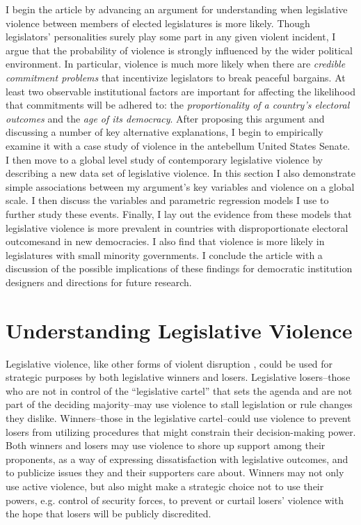 \documentclass[a4paper]{article}\usepackage[]{graphicx}\usepackage[]{color}
\begin{document}
I begin the article by advancing an argument for understanding when legislative violence between members of  elected legislatures is more likely. Though legislators' personalities surely play some part in any given violent incident, I argue that the probability of violence is strongly influenced by the wider political environment. In particular, violence is much more likely when there are \emph{credible commitment problems} that incentivize legislators to break peaceful bargains. At least two observable institutional factors are important for affecting the likelihood that commitments will be adhered to: the \emph{proportionality of a country's electoral outcomes} and the \emph{age of its democracy}. After proposing this argument and discussing a number of key alternative explanations, I begin to empirically examine it with a case study of violence in the antebellum United States Senate. I then move to a global level study of contemporary legislative violence by describing a new data set of legislative violence. In this section I also demonstrate simple associations between my argument's key variables and violence on a global scale. I then discuss the variables and parametric regression models I use to further study these events. Finally, I lay out the evidence from these models that legislative violence is more prevalent in countries with disproportionate electoral outcomesand in new democracies. I also find that violence is more likely in legislatures with small minority governments. I conclude the article with a discussion of the possible implications of these findings for democratic institution designers and directions for future research.


\section{Understanding Legislative Violence}

Legislative violence, like other forms of violent disruption \citep[]{Beaulieu2008,BeaulieuForthcoming,wilkinson2006}, could be used for strategic purposes by both legislative winners and losers. Legislative losers--those who are not in control of the ``legislative cartel''  that sets the agenda \citep{cox2007} and are not part of the deciding majority--may use violence to stall legislation or rule changes they dislike. Winners--those in the legislative cartel--could use violence to prevent losers from utilizing procedures that might constrain their decision-making power. Both winners and losers may use violence to shore up support among their proponents, as a way of expressing dissatisfaction with legislative outcomes, and to publicize issues they and their supporters care about. Winners may not only use active violence, but also might make a strategic choice not to use their powers, e.g. control of security forces, to prevent or curtail losers' violence with the hope that losers will be publicly discredited.
\end{document}
